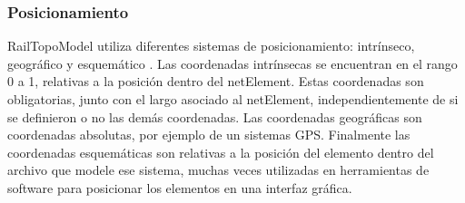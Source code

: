 \subsubsection{Posicionamiento}

    RailTopoModel utiliza diferentes sistemas de posicionamiento: intrínseco, geográfico y esquemático \cite{Paper_112,Paper_150}. Las coordenadas intrínsecas se encuentran en el rango 0 a 1, relativas a la posición dentro del netElement. Estas coordenadas son obligatorias, junto con el largo asociado al netElement, independientemente de si se definieron o no las demás coordenadas. Las coordenadas geográficas son coordenadas absolutas, por ejemplo de un sistemas GPS. Finalmente las coordenadas esquemáticas son relativas a la posición del elemento dentro del archivo que modele ese sistema, muchas veces utilizadas en herramientas de software para posicionar los elementos en una interfaz gráfica.
